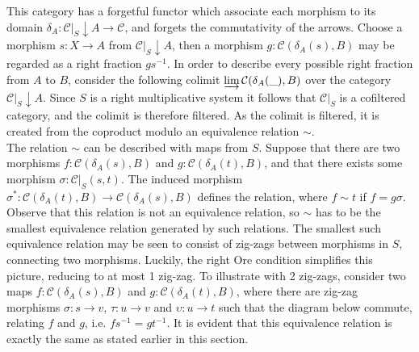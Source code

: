     This category has a forgetful functor which associate each morphism to its domain $\delta_{A} : \mathcal{C}|_{S}\downarrow A \rightarrow \mathcal{C}$, and forgets the commutativity of the arrows. Choose a morphism $s : X \rightarrow A$ from $\mathcal{C}|_{S}\downarrow A$, then a morphism $g:\mathcal{C}(\delta_{A}(s),B)$ may be regarded as a right fraction $gs^{-1}$. In order to describe every possible right fraction from $A$ to $B$, consider the following colimit $\varinjlim\mathcal{C}(\delta_{A}(\_),B)$ over the category $\mathcal{C}|_{S}\downarrow A$. Since $S$ is a right multiplicative system it follows that $\mathcal{C}|_{S}$ is a cofiltered category, and the colimit is therefore filtered. As the colimit is filtered, it is created from the coproduct modulo an equivalence relation $\sim$. \\
    
    The relation $\sim$ can be described with maps from $S$. Suppose that there are two morphisms $f : \mathcal{C}(\delta_A(s),B)$ and $g : \mathcal{C}(\delta_A(t),B)$, and that there exists some morphism $\sigma : \mathcal{C}|_{S}(s,t)$. The induced morphism $\sigma^* : \mathcal{C}(\delta_A(t),B) \rightarrow \mathcal{C}(\delta_A(s),B)$ defines the relation, where $f \sim t$ if $f = g\sigma$. Observe that this relation is not an equivalence relation, so $\sim$ has to be the smallest equivalence relation generated by such relations. The smallest such equivalence relation may be seen to consist of zig-zags between morphisms in $S$, connecting two morphisms. Luckily, the right Ore condition simplifies this picture, reducing to at most 1 zig-zag. To illustrate with 2 zig-zags, consider two maps $f : \mathcal{C}(\delta_A(s),B)$ and $g : \mathcal{C}(\delta_A(t),B)$, where there are zig-zag morphisms $\sigma : s \rightarrow v$, $\tau : u \rightarrow v$ and $\upsilon : u \rightarrow t$ such that the diagram below commute, relating $f$ and $g$, i.e. $fs^{-1}=gt^{-1}$. It is evident that this equivalence relation is exactly the same as stated earlier in this section.

    \begin{center}
    \end{center}

